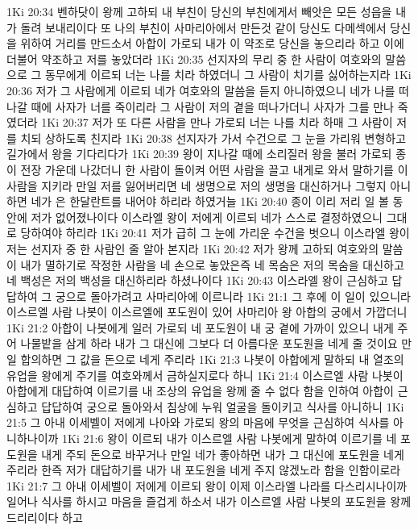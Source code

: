 1Ki 20:34  벤하닷이 왕께 고하되 내 부친이 당신의 부친에게서 빼앗은 모든 성읍을 내가 돌려 보내리이다 또 나의 부친이 사마리아에서 만든것 같이 당신도 다메섹에서 당신을 위하여 거리를 만드소서 아합이 가로되 내가 이 약조로 당신을 놓으리라 하고 이에 더불어 약조하고 저를 놓았더라
1Ki 20:35  선지자의 무리 중 한 사람이 여호와의 말씀으로 그 동무에게 이르되 너는 나를 치라 하였더니 그 사람이 치기를 싫어하는지라
1Ki 20:36  저가 그 사람에게 이르되 네가 여호와의 말씀을 듣지 아니하였으니 네가 나를 떠나갈 때에 사자가 너를 죽이리라 그 사람이 저의 곁을 떠나가더니 사자가 그를 만나 죽였더라
1Ki 20:37  저가 또 다른 사람을 만나 가로되 너는 나를 치라 하매 그 사람이 저를 치되 상하도록 친지라
1Ki 20:38  선지자가 가서 수건으로 그 눈을 가리워 변형하고 길가에서 왕을 기다리다가
1Ki 20:39  왕이 지나갈 때에 소리질러 왕을 불러 가로되 종이 전장 가운데 나갔더니 한 사람이 돌이켜 어떤 사람을 끌고 내게로 와서 말하기를 이 사람을 지키라 만일 저를 잃어버리면 네 생명으로 저의 생명을 대신하거나 그렇지 아니하면 네가 은 한달란트를 내어야 하리라 하였거늘
1Ki 20:40  종이 이리 저리 일 볼 동안에 저가 없어졌나이다 이스라엘 왕이 저에게 이르되 네가 스스로 결정하였으니 그대로 당하여야 하리라
1Ki 20:41  저가 급히 그 눈에 가리운 수건을 벗으니 이스라엘 왕이 저는 선지자 중 한 사람인 줄 알아 본지라
1Ki 20:42  저가 왕께 고하되 여호와의 말씀이 내가 멸하기로 작정한 사람을 네 손으로 놓았은즉 네 목숨은 저의 목숨을 대신하고 네 백성은 저의 백성을 대신하리라 하셨나이다
1Ki 20:43  이스라엘 왕이 근심하고 답답하여 그 궁으로 돌아가려고 사마리아에 이르니라
1Ki 21:1  그 후에 이 일이 있으니라 이스르엘 사람 나봇이 이스르엘에 포도원이 있어 사마리아 왕 아합의 궁에서 가깝더니
1Ki 21:2  아합이 나봇에게 일러 가로되 네 포도원이 내 궁 곁에 가까이 있으니 내게 주어 나물밭을 삼게 하라 내가 그 대신에 그보다 더 아름다운 포도원을 네게 줄 것이요 만일 합의하면 그 값을 돈으로 네게 주리라
1Ki 21:3  나봇이 아합에게 말하되 내 열조의 유업을 왕에게 주기를 여호와께서 금하실지로다 하니
1Ki 21:4  이스르엘 사람 나봇이 아합에게 대답하여 이르기를 내 조상의 유업을 왕께 줄 수 없다 함을 인하여 아합이 근심하고 답답하여 궁으로 돌아와서 침상에 누워 얼굴을 돌이키고 식사를 아니하니
1Ki 21:5  그 아내 이세벨이 저에게 나아와 가로되 왕의 마음에 무엇을 근심하여 식사를 아니하나이까
1Ki 21:6  왕이 이르되 내가 이스르엘 사람 나봇에게 말하여 이르기를 네 포도원을 내게 주되 돈으로 바꾸거나 만일 네가 좋아하면 내가 그 대신에 포도원을 네게 주리라 한즉 저가 대답하기를 내가 내 포도원을 네게 주지 않겠노라 함을 인함이로라
1Ki 21:7  그 아내 이세벨이 저에게 이르되 왕이 이제 이스라엘 나라를 다스리시나이까 일어나 식사를 하시고 마음을 즐겁게 하소서 내가 이스르엘 사람 나봇의 포도원을 왕께 드리리이다 하고
